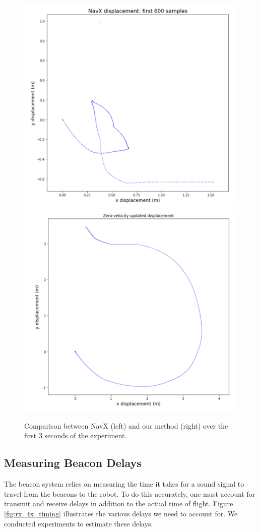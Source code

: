 \documentclass{article}
\begin{document}
		\begin{figure}[H]
			\centering
			\includegraphics[width=0.49\linewidth]{./images/navx-displacement-3s.png}
			\includegraphics[width=0.49\linewidth]{./images/zero-displacement-3s.png}
			\caption{Comparison between NavX (left) and our method (right) over the first 3 seconds of the experiment.}
			\label{fig:displacement_comparison_3s}
		\end{figure}

  \subsection{Measuring Beacon Delays}

    The beacon system relies on measuring the time it takes for a sound signal to travel from the beacons to the robot. To do this accurately, one must account for transmit and receive delays in addition to the actual time of flight. Figure \ref{fig:rx_tx_timing} illustrates the various delays we need to account for. We conducted experiments to estimate these delays.
\end{document}
